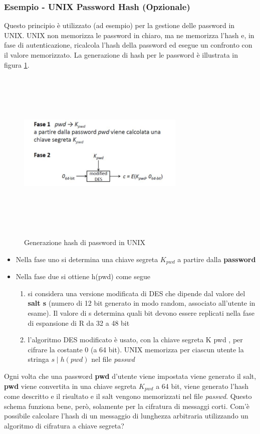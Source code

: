 \subsubsection{Esempio - UNIX Password Hash (Opzionale)}
Questo principio è utilizzato (ad esempio) per la gestione delle password in UNIX. UNIX non memorizza le password in chiaro, ma ne memorizza l'hash e, in fase di autenticazione, ricalcola l'hash della password ed esegue un confronto con il valore memorizzato. La generazione di hash per le password è illustrata in figura \ref{fig:pass_hash}.
\begin{figure}
	\begin{center}
	{\includegraphics[height=8cm, width=8cm, keepaspectratio]{Immagini/hash/schema_des_come_hash.JPG}}
	\caption{Generazione hash di password in UNIX \label{fig:pass_hash}}
	\end{center}
\end{figure}
\begin{itemize}
\item Nella fase uno si determina una chiave segreta $K_{pwd}$ a partire dalla \textbf{password}
\item Nella fase due si ottiene h(pwd) come segue
\begin{enumerate}
	\item si considera una versione modificata di DES che dipende dal valore del \textbf{salt s} (numero di 12 bit generato in modo random, associato all'utente in esame). Il valore di s determina quali bit devono essere replicati nella fase di espansione di R da 32 a 48 bit
	\item l'algoritmo DES modificato è usato, con la chiave segreta K pwd , per cifrare la costante 0 (a 64 bit). UNIX memorizza per ciascun utente la stringa $s \mid h(pwd)$ nel file \textit{passwd}
\end{enumerate}
\end{itemize}
Ogni volta che una password \textbf{pwd} d'utente viene impostata viene generato il salt, \textbf{pwd} viene convertita in una chiave segreta $K_{pwd}$ a 64 bit, viene generato l'hash come descritto e il risultato e il salt vengono memorizzati nel file \textit{passwd}.
\newline \newline
Questo schema funziona bene, però, solamente per la cifratura di messaggi corti. Com'è possibile calcolare l'hash di un messaggio di lunghezza arbitraria utilizzando un algoritmo di cifratura a chiave segreta?
